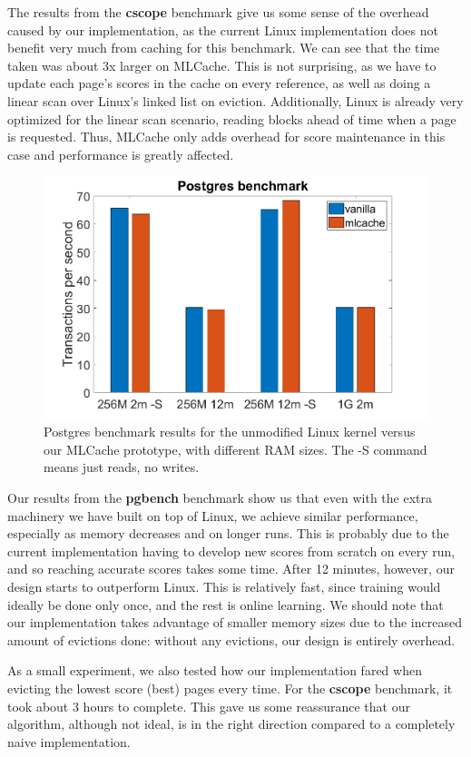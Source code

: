 The results from the \textbf{cscope} benchmark give us some sense of the
overhead caused by our implementation, as the current Linux implementation does
not benefit very much from caching for this benchmark. We can see that the time
taken was about 3x larger on MLCache. This is not surprising, as we have to update
each page's scores in the cache on every reference, as well as doing a linear
scan over Linux's linked list on eviction. Additionally, Linux is already very optimized
for the linear scan scenario, reading blocks ahead of time when a page is requested.
Thus, MLCache only adds overhead for score maintenance in this case and performance
is greatly affected.

\label{fig:pg}


\begin{figure}[h]
	\includegraphics[scale=0.3]{img/postgres_results_bigger.png}
	\caption{Postgres benchmark results for the unmodified Linux kernel versus our MLCache prototype, with different RAM sizes. The -S command means just reads, no writes.}
\end{figure}

Our results from the \textbf{pgbench} benchmark show us that even with the extra
machinery we have built on top of Linux, we achieve similar performance,
especially as memory decreases and on longer runs. This is probably due to the
current implementation having to develop new scores from scratch on every run,
and so reaching accurate scores takes some time. After 12 minutes, however, our
design starts to outperform Linux. This is relatively fast, since training
would ideally be done only once, and the rest is online learning. We should
note that our implementation takes advantage of smaller memory sizes due to the
increased amount of evictions done: without any evictions, our design is entirely
overhead.

As a small experiment, we also tested how our implementation fared when
evicting the lowest score (best) pages every time. For the \textbf{cscope} benchmark, it
took about 3 hours to complete. This gave us some reassurance that our algorithm,
although not ideal, is in the right direction compared to a completely naive
implementation.
